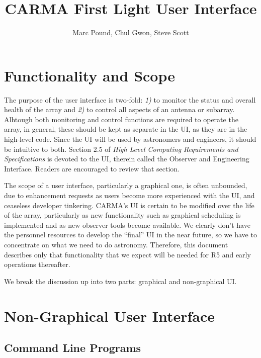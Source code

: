 \documentclass[preprint]{aastex}
\begin{document}
\title{CARMA First Light User Interface}
\author{Marc Pound, Chul Gwon, Steve Scott}


\section{Functionality and Scope}
The purpose of the user interface is two-fold: {\it 1)}
to monitor the status and
overall health of the array and {\it 2)} to control all aspects of an antenna
or subarray.  Alhtough both monitoring and control functions are required to
operate the array, in general, these should be kept
as separate in the UI, as they are in the high-level code.
Since the UI will be used by astronomers and engineers,
it should be intuitive to both.
Section 2.5 of {\sl High Level Computing
Requirements and Specifications} is devoted to the UI, therein called
the Observer and Engineering Interface.   Readers are encouraged
to review that section.

The scope of a user interface, particularly a graphical one, is often
unbounded,  due to enhancement requests as users become more experienced
with the UI, and ceaseless developer tinkering.  CARMA's UI is certain to
be modified over the life of the array, particularly as new functionality
such as graphical scheduling is implemented and as new observer tools become
available.  We clearly don't have the personnel resources to develop the
``final'' UI in the near future, so we have to concentrate on what we need
to do astronomy.  Therefore, this document describes only that functionality
that we expect will be needed for R5 and early operations thereafter.

We break the discussion up into two parts: graphical and non-graphical UI.

\section{Non-Graphical User Interface}
\subsection{Command Line Programs}
\end{document}
